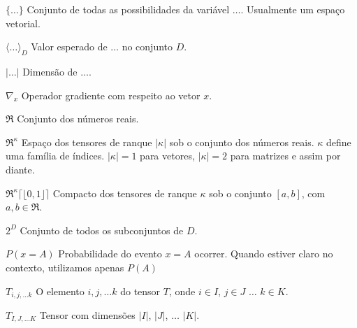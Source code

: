\begin{simbolos}
  \item[$ \{\ldots\} $] Conjunto de todas as possibilidades da variável $\ldots$. Usualmente um espaço vetorial.

  \item[$ \langle \ldots \rangle_{D} $] Valor esperado de $\ldots$ no conjunto $D$.

  \item[$| \ldots |$] Dimensão de $\ldots$.

  \item[$\nabla_{x}$] Operador gradiente com respeito ao vetor $x$.
    
  \item[$\Re$] Conjunto dos números reais.
  
  \item[$\Re^{\kappa}$] Espaço dos tensores de ranque $|\kappa|$ sob o conjunto dos números reais. $\kappa$ define uma família de índices. $|\kappa| = 1$ para vetores, $|\kappa| = 2$ para matrizes e assim por diante.
  
  \item[$ \Re^{\kappa} \lceil \!\!\! \lfloor0,1 \rfloor \!\!\! \rceil $] Compacto dos tensores de ranque $\kappa$ sob o conjunto $[a,b]$, com $a, b \in \Re$. 
  
  \item[$2^D$] Conjunto de todos os subconjuntos de $D$.
   
  \item[$P(x=A)$] Probabilidade do evento $x=A$ ocorrer. Quando estiver claro no contexto, utilizamos apenas $P(A)$
  
  \item[$T_{i, j, \ldots k}$] O elemento $i, j, \ldots k$ do tensor $T$, onde $i \in I$, $j \in J$ $\ldots$ $k \in K$. 
  
  \item[$T_{I, J, \ldots K}$] Tensor com dimensões $|I|$, $|J|$, $\ldots$ $|K|$.

\end{simbolos}